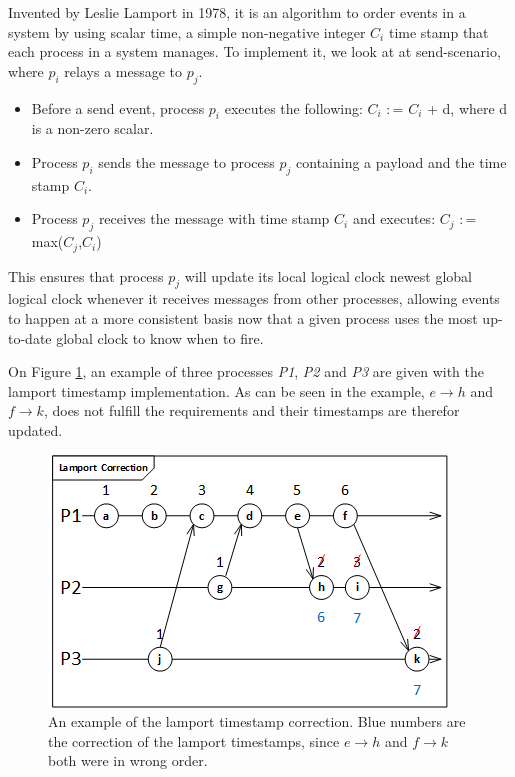 Invented by Leslie Lamport in 1978, it is an algorithm to order events in a system by using scalar time, a simple non-negative integer $C_i$ time stamp that each process in a system manages. To implement it, we look at at send-scenario, where $p_i$ relays a message to $p_j$.

\begin{itemize}
	\item Before a send event, process $p_i$ executes the following: $C_i$ $\colon$=  $C_i$ + d, where d is a non-zero scalar.
	\item Process $p_i$ sends the message to process $p_j$ containing a payload and the time stamp $C_i$.
	\item Process $p_j$ receives the message with time stamp $C_i$ and executes: $C_j$ $\colon$= max($C_j$,$C_i$) 
\end{itemize}

This ensures that process $p_j$ will update its local logical clock newest global logical clock whenever it receives messages from other processes, allowing events to happen at a more consistent basis now that a given process uses the most up-to-date global clock to know when to fire.

On Figure \ref{fig:lamport}, an example of three processes \textit{P1}, \textit{P2} and \textit{P3} are given with the lamport timestamp implementation. As can be seen in the example, $e \rightarrow h$ and $f \rightarrow k$, does not fulfill the requirements and their timestamps are therefor updated.


\begin{figure}[H]
	\centering
	\includegraphics[width=0.5\linewidth]{synchronization/logicalClock/fig/lamport.png}
	\caption{An example of the lamport timestamp correction. Blue numbers are the correction of the lamport timestamps, since $e \rightarrow h$ and $f \rightarrow k$ both were in wrong order.}
	\label{fig:lamport}
\end{figure}

